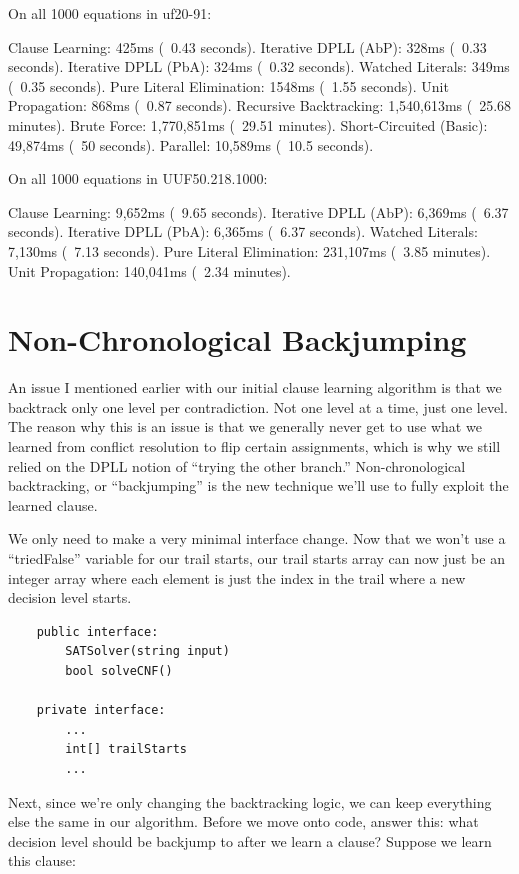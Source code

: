 \documentclass[../main.tex]{subfiles}
\begin{document}
\begin{FVerbatim}
On all 1000 equations in uf20-91:

Clause Learning:           425ms (~0.43 seconds).
Iterative DPLL (AbP):      328ms (~0.33 seconds).
Iterative DPLL (PbA):      324ms (~0.32 seconds).
Watched Literals:          349ms (~0.35 seconds).
Pure Literal Elimination:  1548ms (~1.55 seconds).
Unit Propagation:          868ms (~0.87 seconds).
Recursive Backtracking:    1,540,613ms (~25.68 minutes).
Brute Force:               1,770,851ms (~29.51 minutes).
Short-Circuited (Basic):   49,874ms (~50 seconds).
Parallel:                  10,589ms (~10.5 seconds).

On all 1000 equations in UUF50.218.1000:

Clause Learning:          9,652ms (~9.65 seconds).
Iterative DPLL (AbP):     6,369ms (~6.37 seconds).
Iterative DPLL (PbA):     6,365ms (~6.37 seconds).
Watched Literals:         7,130ms (~7.13 seconds).
Pure Literal Elimination: 231,107ms (~3.85 minutes).
Unit Propagation:         140,041ms (~2.34 minutes).
\end{FVerbatim}

\section{Non-Chronological Backjumping}

An issue I mentioned earlier with our initial clause learning algorithm is that we backtrack 
only one level per contradiction. Not one level at a time, just one level. The reason why this 
is an issue is that we generally never get to use what we learned from conflict resolution to 
flip certain assignments, which is why we still relied on the DPLL notion of ``trying the other 
branch.'' Non-chronological backtracking, or ``backjumping'' is the new technique we'll use 
to fully exploit the learned clause. 

We only need to make a very minimal interface change. Now that we won't use a ``triedFalse''
variable for our trail starts, our trail starts array can now just be an integer array 
where each element is just the index in the trail where a new decision level starts.
\begin{lstlisting}
    public interface:
        SATSolver(string input)
        bool solveCNF()

    private interface:
        ...
        int[] trailStarts
        ...
\end{lstlisting}

Next, since we're only changing the backtracking logic, we can keep 
everything else the same in our algorithm. Before we move onto code, answer this:
what decision level should be backjump to after we learn a clause? Suppose we learn 
this clause: 
\end{document}
